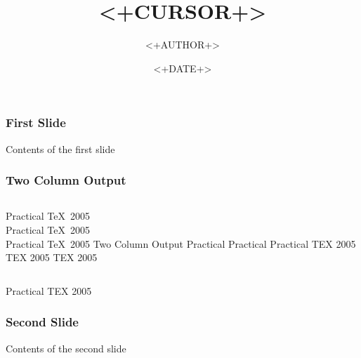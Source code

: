 \documentclass[slidestop,compress,mathserif]{beamer}
\title{<+CURSOR+>}
\author{<+AUTHOR+>}
\date{<+DATE+>}
\begin{document}
\maketitle
\begin{frame}
\frametitle{First Slide}
Contents of the first slide
\end{frame}

\begin{frame}
\frametitle{Two Column Output}
\begin{columns}[c]
\column{1.5in}
Practical \TeX\ 2005\\
Practical \TeX\ 2005\\
Practical \TeX\ 2005
Two Column Output
Practical
Practical
Practical
TEX 2005
TEX 2005
TEX 2005
\column{1.5in}
\framebox{\texttt{[image: p2005]}}
\end{columns}
Practical TEX 2005
\end{frame}

\begin{frame}
\frametitle{Second Slide}
Contents of the second slide
\end{frame}
\end{document}

